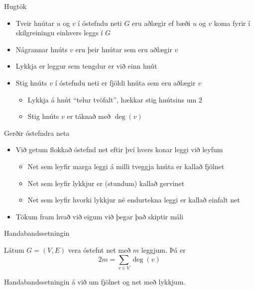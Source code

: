 \documentclass{beamer}
\begin{document}

\begin{frame}{Hugtök}
	\begin{itemize}
		\item Tveir hnútar $u$ og $v$ í óstefndu neti $G$ eru aðlægir  ef bæði $u$ og $v$ koma fyrir í skilgreiningu einhvers leggs í $G$
		\item Nágrannar  hnúts $v$ eru þeir hnútar sem eru aðlægir $v$
		\item Lykkja  er leggur sem tengdur er við einn hnút
		\item Stig  hnúts $v$ í óstefndu neti er fjöldi hnúta sem eru aðlægir $v$
		      \begin{itemize}
			      \item Lykkja á hnút ``telur tvöfalt'', hækkar stig hnútsins um 2
			      \item Stig hnúts $v$ er táknað með $\deg(v)$
		      \end{itemize}
	\end{itemize}
\end{frame}

\begin{frame}{Gerðir óstefndra neta}
	\begin{itemize}
		\item Við getum flokkað óstefnd net eftir því hvers konar leggi við leyfum
		      \begin{itemize}
			      \item Net sem leyfir marga leggi á milli tveggja hnúta er kallað fjölnet 
			      \item Net sem leyfir lykkjur er (stundum) kallað gervinet 
			      \item Net sem leyfir hvorki lykkjur né endurtekna leggi er kallað einfalt net 
		      \end{itemize}
		\item Tökum fram hvað við eigum við þegar það skiptir máli
	\end{itemize}
\end{frame}

\begin{frame}{Handabandssetningin}
	\begin{tcolorbox}[title=Handabandssetningin]
		Látum $G = (V, E)$ vera óstefnt net með $m$ leggjum. Þá er
		\[
			2m = \sum_{v \in V} \deg(v)
		\]
	\end{tcolorbox}
	Handabandssetningin  á við um fjölnet og net með lykkjum.
\end{frame}
\end{document}
